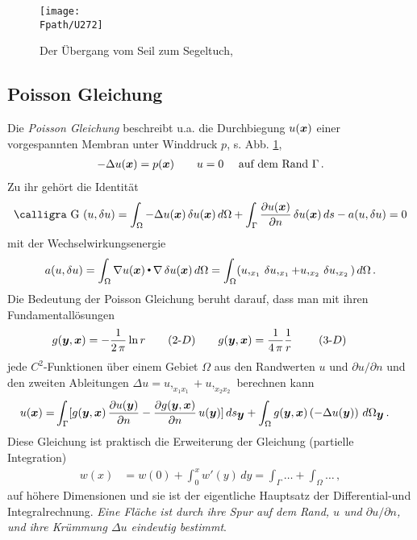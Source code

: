 \begin{figure}[tbp]
\centering
\if {} \sidecaption \fi
\texttt{[image: \\Fpath/U272]}
\caption{Der \"{U}bergang vom Seil zum Segeltuch, \cite{Int1}} \label{U272}
\end{figure}%
\textcolor{sectionTitleBlue}{\section{Poisson Gleichung}}
Die {\em Poisson Gleichung\/} beschreibt u.a. die Durchbiegung $u(\mbox{\boldmath $x$})$ einer vorgespannten Membran unter Winddruck $p$, s. Abb. \ref{U272},
\begin{align}\label{Eq66}
- \Delta u(\mbox{\boldmath $x$}) = p(\mbox{\boldmath $x$}) \qquad u = 0\quad \,\,\text{auf dem Rand $\Gamma$}\,.
\end{align}
Zu ihr geh\"{o}rt die Identit\"{a}t
\begin{align}
\text{\normalfont\calligra G\,\,}(u,\delta u) = \int_{\Omega} - \Delta u(\vek x)\,\delta u(\vek x)\,d\Omega + \int_{\Gamma} \frac{\partial u(\vek x)}{\partial n}\,\delta u(\vek x)\,ds - a(u,\delta u) = 0
\end{align}
mit der Wechselwirkungsenergie
\begin{align}
a(u,\delta u) = \int_{\Omega} \nabla u(\mbox{\boldmath $x$}) {\,\scriptscriptstyle \stackrel{\bullet}{{}}}\, \nabla\,\delta u(\mbox{\boldmath $x$})\,d\Omega = \int_{\Omega} (u,_{x_1}\,\delta u,_{x_1} + u,_{x_2}\,\delta u,_{x_2})\,d\Omega\,.
\end{align}
Die Bedeutung der Poisson Gleichung beruht darauf, dass man mit ihren Fundamentall\"{o}sungen
\begin{align}
 g(\mbox{\boldmath $y$}, \mbox{\boldmath $x$}) = - \frac{1}{2\,\pi}\ln r \qquad \text{(2-$D$)} \qquad g(\mbox{\boldmath $y$}, \mbox{\boldmath $x$}) = \frac{1}{4\,\pi}\frac{1}{r} \qquad \text{ (3-$D$)} \qquad
\end{align}
jede $C^2$-Funktionen \"{u}ber einem Gebiet $\Omega$ aus den Randwerten $u $ und $\partial u/\partial n $ und den zweiten Ableitungen $\Delta u = u,_{x_1 x_1} + u,_{x_2 x_2}$ berechnen kann
\begin{align}\label{Eq175}
u(\mbox{\boldmath $x$}) = &\int_{\Gamma} [g(\mbox{\boldmath $y$}, \mbox{\boldmath $x$}) \,\frac{\partial u(\mbox{\boldmath $y$})}{\partial n} - \frac{\partial g(\mbox{\boldmath $y$}, \mbox{\boldmath $x$})}{\partial n}\,u(\mbox{\boldmath $y$})]\,ds_{\mbox{\boldmath $y$}} + \int_{\Omega} g(\mbox{\boldmath $y$}, \mbox{\boldmath $x$})\,(- \Delta u(\mbox{\boldmath $y$}))\,\,d\Omega_{\mbox{\boldmath $y$}}\,.
\end{align}
Diese Gleichung ist praktisch die Erweiterung der Gleichung (partielle Integration)
\begin{align}
w(x) &= w(0) + \int_{0}^{x} w'(y)\,dy = \int_{\Gamma} \ldots + \int_{\Omega} \ldots \,,
\end{align}
auf h\"{o}here Dimensionen und sie ist der eigentliche Hauptsatz der Differential-und Integralrechnung. {\em Eine Fl\"{a}che ist durch ihre \glq Spur\grq{} auf dem Rand, $u$ und $\partial u/\partial n$, und ihre \glq Kr\"{u}mmung\grq{} $\Delta u$ eindeutig bestimmt\/}.

